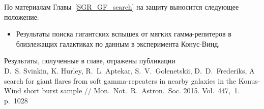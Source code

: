 По материалам Главы~\ref{SGR_GF_search} на защиту выносится следующее положение:
\begin{itemize}
\item Результаты поиска гигантских вспышек от мягких гамма-репитеров 
    в близлежащих галактиках по данным в эксперимента Конус-Винд. 
\end{itemize}

Результаты, полученные в главе, отражены публикации\\
D.~S. Svinkin, K. Hurley, R.~L. Aptekar, S.~V.~Golenetskii, D.~D.~Frederiks, 
A search for giant flares from soft gamma-repeaters in nearby galaxies in the 
Konus-Wind short burst sample // Mon.~Not.~R.~Astron.~Soc. 2015. Vol.~447,~1. p.~1028

\clearpage